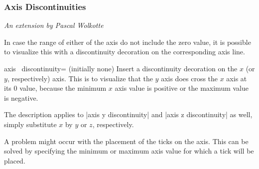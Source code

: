 \subsubsection{Axis Discontinuities}

{\small \emph{An extension by Pascal Wolkotte}}
\vspace{0.4cm}%

\noindent In case the range of either of the axis do not include the zero value, it is possible to visualize this with a discontinuity decoration on the corresponding axis line.

\begin{pgfplotsxykey}{axis \x\ discontinuity= (initially none)}
Insert a discontinuity decoration on the $x$ (or $y$, respectively) axis. 
This is to visualize that the $y$ axis does cross the $x$ axis at its $0$ value, because the minimum $x$ axis value is positive or the maximum value is negative.

The description applies to |axis y discontinuity| and |axis z discontinuity| as well, simply substitute $x$ by $y$ or $z$, respectively.

\begin{codeexample}[]
\end{codeexample}

\begin{codeexample}[]
\end{codeexample}
\end{pgfplotsxykey}

A problem might occur with the placement of the ticks on the axis.
This can be solved by specifying the minimum or maximum axis value for which a tick will be placed.

